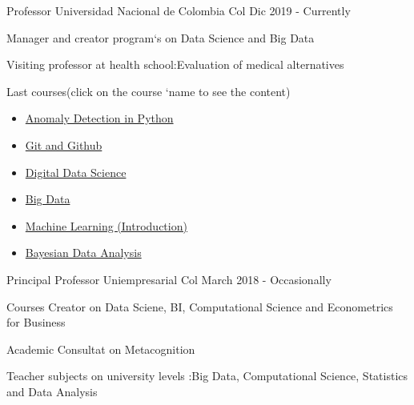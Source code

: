

\begin{cventries}

\cventry
    {Professor}
    {Universidad Nacional de Colombia}
    {Col}
    {Dic 2019 - Currently}
    {
    \begin{cvitems}
    \item {Manager and creator program`s on Data Science and Big Data}
    \item {Visiting professor at health school:Evaluation of medical alternatives}
    \item {Last courses(click on the course `name  to see the content)}
    \begin{itemize}
         \item {\textcolor{brown}{\href{https://github.com/carlosjimenez88M/Github-Class/tree/master}{Anomaly Detection in Python}}}
        \item {\textcolor{brown}{\href{https://github.com/carlosjimenez88M/Github-Class/tree/master}{Git and Github}}}
        \item {\textcolor{brown}{\href{https://github.com/carlosjimenez88M/Marketing_Digital}{Digital Data Science}}}
        \item {\textcolor{brown}{\href{https://github.com/carlosjimenez88M/Curso-de-Big-Data-e-Ingenieria-de-datos}{Big Data}}}
        \item {\textcolor{brown}{\href{https://github.com/carlosjimenez88M/Machine_Learning}{Machine Learning (Introduction)}}}
        \item {\textcolor{brown}{\href{https://github.com/carlosjimenez88M/Curso-de-Big-Data-e-Ingenieria-de-datos}{Bayesian Data Analysis}}}
    \end{itemize}
    \end{cvitems}
    }
 




  \cventry
    {Principal Professor } %
    {Uniempresarial} %
    {Col} %
    {March 2018 - Occasionally} %
    {
      \begin{cvitems} %
        \item {Courses Creator on Data Sciene, BI, Computational Science and Econometrics for Business}
        \item {Academic Consultat on Metacognition }
        \item {Teacher  subjects on university levels :Big Data, Computational Science, Statistics and Data Analysis}
      \end{cvitems}
    }


\end{cventries}
